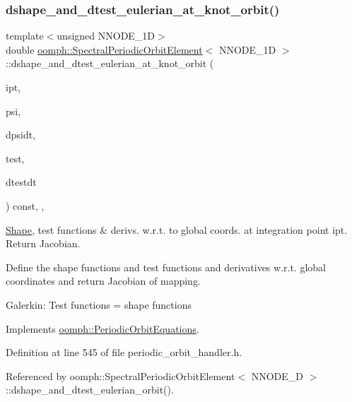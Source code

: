 \subsubsection{\texorpdfstring{dshape\+\_\+and\+\_\+dtest\+\_\+eulerian\+\_\+at\+\_\+knot\+\_\+orbit()}{dshape\_and\_dtest\_eulerian\_at\_knot\_orbit()}}
{\footnotesize\ttfamily template$<$unsigned N\+N\+O\+D\+E\+\_\+1D$>$ \\
double \hyperlink{classoomph_1_1SpectralPeriodicOrbitElement}{oomph\+::\+Spectral\+Periodic\+Orbit\+Element}$<$ N\+N\+O\+D\+E\+\_\+1D $>$\+::dshape\+\_\+and\+\_\+dtest\+\_\+eulerian\+\_\+at\+\_\+knot\+\_\+orbit (\begin{DoxyParamCaption}\item[{const unsigned \&}]{ipt,  }\item[{\hyperlink{classoomph_1_1Shape}{Shape} \&}]{psi,  }\item[{\hyperlink{classoomph_1_1DShape}{D\+Shape} \&}]{dpsidt,  }\item[{\hyperlink{classoomph_1_1Shape}{Shape} \&}]{test,  }\item[{\hyperlink{classoomph_1_1DShape}{D\+Shape} \&}]{dtestdt }\end{DoxyParamCaption}) const\hspace{0.3cm}{\ttfamily [inline]}, {\ttfamily [protected]}, {\ttfamily [virtual]}}



\hyperlink{classoomph_1_1Shape}{Shape}, test functions \& derivs. w.\+r.\+t. to global coords. at integration point ipt. Return Jacobian. 

Define the shape functions and test functions and derivatives w.\+r.\+t. global coordinates and return Jacobian of mapping.

Galerkin\+: Test functions = shape functions 

Implements \hyperlink{classoomph_1_1PeriodicOrbitEquations_a2bf0f39d52d1416242a7f618c2ece5ca}{oomph\+::\+Periodic\+Orbit\+Equations}.



Definition at line 545 of file periodic\+\_\+orbit\+\_\+handler.\+h.



Referenced by oomph\+::\+Spectral\+Periodic\+Orbit\+Element$<$ N\+N\+O\+D\+E\+\_\+D $>$\+::dshape\+\_\+and\+\_\+dtest\+\_\+eulerian\+\_\+orbit().

\mbox{\label{classoomph_1_1SpectralPeriodicOrbitElement_a09b5fc5cee00d470952242dfea75de69}} 
